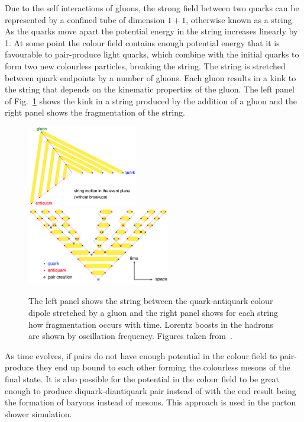 Due to the self interactions of gluons, the strong field between two quarks can be represented by a confined tube of dimension $1+1$, otherwise known as a string. 
As the quarks move apart the potential energy in the string increases linearly by 1\GeV{}\fminv{}.
At some point the colour field contains enough potential energy that it is favourable to pair-produce light quarks, which combine with the initial quarks to form two new colourless particles, breaking the string.
The string is stretched between quark endpoints by a number of gluons.
Each gluon results in a kink to the string that depends on the kinematic properties of the gluon.
The left panel of Fig.~\ref{fig:Lund} shows the kink in a string produced by the addition of a gluon and the right panel shows the fragmentation of the string.
\begin{figure}[htpb]
	\centering
	\includegraphics[width=0.43\textwidth]{Figures/Generator_Lund2}
	\includegraphics[width=0.56\textwidth]{Figures/Generator_Lund}
	\caption[The left panel shows the string between the quark-antiquark colour dipole stretched by a gluon and the right panel shows for each string how fragmentation occurs with time. Lorentz boosts in the hadrons are shown by oscillation frequency. ]{The left panel shows the string between the quark-antiquark colour dipole stretched by a gluon and the right panel shows for each string how fragmentation occurs with time. Lorentz boosts in the hadrons are shown by oscillation frequency. Figures taken from~\cite{Gen:Lund}.}
	\label{fig:Lund}
\end{figure}
As time evolves, if \qqbar{} pairs do not have enough potential in the colour field to pair-produce they end up bound to each other forming the colourless mesons of the final state.
It is also possible for the potential in the colour field to be great enough to produce diquark-diantiquark pair instead of \qqbar{} with the end result being the formation of baryons instead of mesons.
This approach is used in the \pythia{} parton shower simulation.

